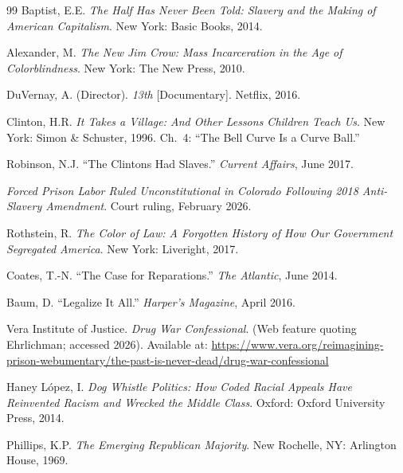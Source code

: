 \documentclass[12pt]{article}
\begin{document}
\begin{thebibliography}{99}
Baptist, E.E. \textit{The Half Has Never Been Told: Slavery and the Making of American Capitalism}. New York: Basic Books, 2014.

Alexander, M. \textit{The New Jim Crow: Mass Incarceration in the Age of Colorblindness}. New York: The New Press, 2010.

DuVernay, A. (Director). \textit{13th} [Documentary]. Netflix, 2016.


Clinton, H.R. \textit{It Takes a Village: And Other Lessons Children Teach Us}. New York: Simon \& Schuster, 1996. Ch.~4: ``The Bell Curve Is a Curve Ball.''

Robinson, N.J. ``The Clintons Had Slaves.'' \textit{Current Affairs}, June 2017.

\textit{Forced Prison Labor Ruled Unconstitutional in Colorado Following 2018 Anti-Slavery Amendment}. Court ruling, February 2026.


Rothstein, R. \textit{The Color of Law: A Forgotten History of How Our Government Segregated America}. New York: Liveright, 2017.

Coates, T.-N. ``The Case for Reparations.'' \textit{The Atlantic}, June 2014.


Baum, D. ``Legalize It All.'' \textit{Harper's Magazine}, April 2016.

Vera Institute of Justice. \textit{Drug War Confessional}. (Web feature quoting Ehrlichman; accessed 2026). Available at: \url{https://www.vera.org/reimagining-prison-webumentary/the-past-is-never-dead/drug-war-confessional}

Haney L\'{o}pez, I. \textit{Dog Whistle Politics: How Coded Racial Appeals Have Reinvented Racism and Wrecked the Middle Class}. Oxford: Oxford University Press, 2014.

Phillips, K.P. \textit{The Emerging Republican Majority}. New Rochelle, NY: Arlington House, 1969.



\end{thebibliography}
\end{document}

